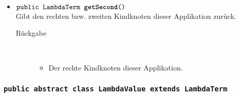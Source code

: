 \begin{description}
\begin{itemize}
		\item $\texttt{public LambdaTerm \textbf{getSecond}()}$ \\ Gibt den rechten bzw. zweiten Kindknoten dieser Applikation zurück.
		\begin{description}
			\item[Rückgabe] \hfill \\
			\vspace{-.8cm}
			\begin{itemize}
				\item  Der rechte Kindknoten dieser Applikation.
			\end{itemize}
		\end{description}
	\end{itemize}
\end{description}

\subsubsection{\normalfont \texttt{public abstract class \textbf{LambdaValue} extends LambdaTerm}}

